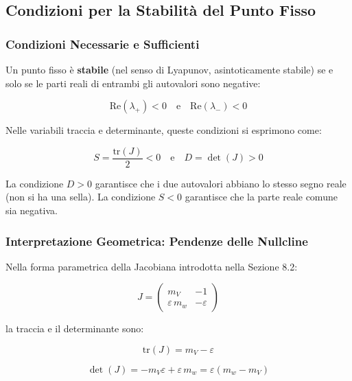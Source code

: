 \subsection{Condizioni per la Stabilità del Punto Fisso}

\subsubsection{Condizioni Necessarie e Sufficienti}

Un punto fisso è \textbf{stabile} (nel senso di Lyapunov, asintoticamente stabile) se e solo se le parti reali di entrambi gli autovalori sono negative:

\begin{equation}
\text{Re}(\lambda_+) < 0 \quad \text{e} \quad \text{Re}(\lambda_-) < 0
\end{equation}

Nelle variabili traccia e determinante, queste condizioni si esprimono come:

\begin{equation}
S = \frac{\text{tr}(J)}{2} < 0 \quad \text{e} \quad D = \det(J) > 0
\end{equation}

La condizione $D > 0$ garantisce che i due autovalori abbiano lo stesso segno reale (non si ha una sella). La condizione $S < 0$ garantisce che la parte reale comune sia negativa.

\subsubsection{Interpretazione Geometrica: Pendenze delle Nullcline}

Nella forma parametrica della Jacobiana introdotta nella Sezione 8.2:

\begin{equation}
J = \begin{pmatrix} m_V & -1 \\ \varepsilon \, m_w & -\varepsilon \end{pmatrix}
\end{equation}

la traccia e il determinante sono:

\begin{equation}
\text{tr}(J) = m_V - \varepsilon
\end{equation}

\begin{equation}
\det(J) = -m_V \varepsilon + \varepsilon \, m_w = \varepsilon(m_w - m_V)
\end{equation}

